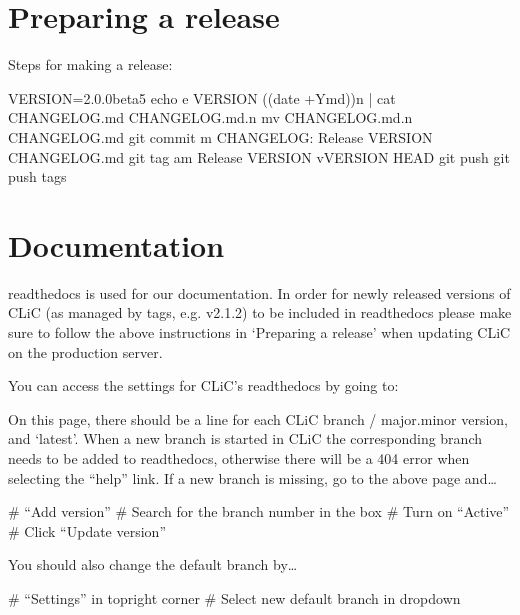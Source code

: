 \documentclass[letterpaper,10pt,english]{sphinxmanual}
\begin{document}
\section{Preparing a release}
\label{\detokenize{advanced/development:preparing-a-release}}
\sphinxAtStartPar
Steps for making a release:

\begin{sphinxVerbatim}[commandchars=\\\{\}]
VERSION=\PYGZdq{}2.0.0\PYGZhy{}beta5\PYGZdq{}
echo \PYGZhy{}e \PYGZdq{}\PYGZsh{}\PYGZsh{} \PYGZdl{}\PYGZob{}VERSION\PYGZcb{} (\PYGZdl{}(date +\PYGZsq{}\PYGZpc{}Y\PYGZhy{}\PYGZpc{}m\PYGZhy{}\PYGZpc{}d\PYGZsq{}))\PYGZbs{}n\PYGZdq{} | cat \PYGZhy{} CHANGELOG.md \PYGZgt{} CHANGELOG.md.n
mv CHANGELOG.md.n CHANGELOG.md
git commit \PYGZhy{}m \PYGZdq{}CHANGELOG: Release \PYGZdl{}\PYGZob{}VERSION\PYGZcb{}\PYGZdq{} CHANGELOG.md
git tag \PYGZhy{}am \PYGZdq{}Release \PYGZdl{}\PYGZob{}VERSION\PYGZcb{}\PYGZdq{} v\PYGZdl{}\PYGZob{}VERSION\PYGZcb{} HEAD
git push \PYGZam{}\PYGZam{} git push \PYGZhy{}\PYGZhy{}tags
\end{sphinxVerbatim}


\section{Documentation}
\label{\detokenize{advanced/development:documentation}}
\sphinxAtStartPar
readthedocs is used for our documentation. In order for newly released versions of CLiC (as managed by tags, e.g. v2.1.2) to be included in readthedocs please make sure to follow the above instructions in ‘Preparing a release’ when updating CLiC on the production server.

\sphinxAtStartPar
You can access the settings for CLiC’s readthedocs by going to: 

\sphinxAtStartPar
On this page, there should be a line for each CLiC branch / major.minor version, and ‘latest’. When a new branch is started in CLiC the corresponding branch needs to be added to readthedocs, otherwise there will be a 404 error when selecting the “help” link. If a new branch is missing, go to the above page and…

\sphinxAtStartPar
\# “Add version”
\# Search for the branch number in the box
\# Turn on “Active”
\# Click “Update version”

\sphinxAtStartPar
You should also change the default branch by…

\sphinxAtStartPar
\# “Settings” in top\sphinxhyphen{}right corner
\# Select new default branch in drop\sphinxhyphen{}down
\end{document}
